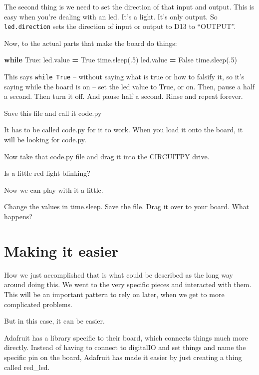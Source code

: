 \documentclass[
]{book}
\newenvironment{Shaded}{\begin{snugshade}}{\end{snugshade}}
\newcommand{\ControlFlowTok}[1]{\textcolor[rgb]{0.13,0.29,0.53}{\textbf{#1}}}
\newcommand{\DecValTok}[1]{\textcolor[rgb]{0.00,0.00,0.81}{#1}}
\newcommand{\NormalTok}[1]{#1}
\newcommand{\OperatorTok}[1]{\textcolor[rgb]{0.81,0.36,0.00}{\textbf{#1}}}
\newcommand{\VariableTok}[1]{\textcolor[rgb]{0.00,0.00,0.00}{#1}}
\begin{document}
The second thing is we need to set the direction of that input and output. This is easy when you're dealing with an led. It's a light. It's only output. So \texttt{led.direction} sets the direction of input or output to D13 to ``OUTPUT''.

Now, to the actual parts that make the board do things:

\begin{Shaded}
\begin{Highlighting}[]
\ControlFlowTok{while} \VariableTok{True}\NormalTok{:}
\NormalTok{    led.value }\OperatorTok{=} \VariableTok{True}
\NormalTok{    time.sleep(.}\DecValTok{5}\NormalTok{)}
\NormalTok{    led.value }\OperatorTok{=} \VariableTok{False}
\NormalTok{    time.sleep(.}\DecValTok{5}\NormalTok{)}
\end{Highlighting}
\end{Shaded}

This says \texttt{while\ True} -- without saying what is true or how to falsify it, so it's saying while the board is on -- set the led value to True, or on. Then, pause a half a second. Then turn it off. And pause half a second. Rinse and repeat forever.

Save this file and call it code.py

It has to be called code.py for it to work. When you load it onto the board, it will be looking for code.py.

Now take that code.py file and drag it into the CIRCUITPY drive.

Is a little red light blinking?

Now we can play with it a little.

Change the values in time.sleep. Save the file. Drag it over to your board. What happens?

\hypertarget{making-it-easier}{%
\section{Making it easier}\label{making-it-easier}}

How we just accomplished that is what could be described as the long way around doing this. We went to the very specific pieces and interacted with them. This will be an important pattern to rely on later, when we get to more complicated problems.

But in this case, it can be easier.

Adafruit has a library specific to their board, which connects things much more directly. Instead of having to connect to digitalIO and set things and name the specific pin on the board, Adafruit has made it easier by just creating a thing called red\_led.
\end{document}
